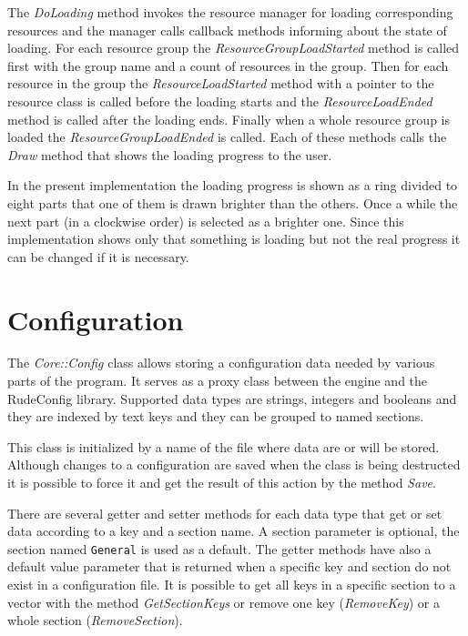 \documentclass[a4paper, 12pt]{report}
\begin{document}
The \emph{DoLoading} method invokes the resource manager for loading corresponding resources and the manager calls callback methods informing about the state of loading. For each resource group the \emph{ResourceGroupLoadStarted} method is called first with the group name and a count of resources in the group. Then for each resource in the group the \emph{ResourceLoadStarted} method with a pointer to the resource class is called before the loading starts and the \emph{ResourceLoadEnded} method is called after the loading ends. Finally when a whole resource group is loaded the \emph{ResourceGroupLoadEnded} is called. Each of these methods calls the \emph{Draw} method that shows the loading progress to the user.

In the present implementation the loading progress is shown as a ring divided to eight parts that one of them is drawn brighter than the others. Once a while the next part (in a clockwise order) is selected as a brighter one. Since this implementation shows only that something is loading but not the real progress it can be changed if it is necessary.

\section{Configuration}
\label{sec:config}

The \emph{Core::Config} class allows storing a configuration data needed by various parts of the program. It serves as a proxy class between the engine and the RudeConfig library\cite{rudeconfig}. Supported data types are strings, integers and booleans and they are indexed by text keys and they can be grouped to named sections.

This class is initialized by a name of the file where data are or will be stored. Although changes to a configuration are saved when the class is being destructed it is possible to force it and get the result of this action by the method \emph{Save}.

There are several getter and setter methods for each data type that get or set data according to a key and a section name. A section parameter is optional, the section named \verb|General| is used as a default. The getter methods have also a default value parameter that is returned when a specific key and section do not exist in a configuration file. It is possible to get all keys in a specific section to a vector with the method \emph{GetSectionKeys} or remove one key (\emph{RemoveKey}) or a whole section (\emph{RemoveSection}).
\end{document}
